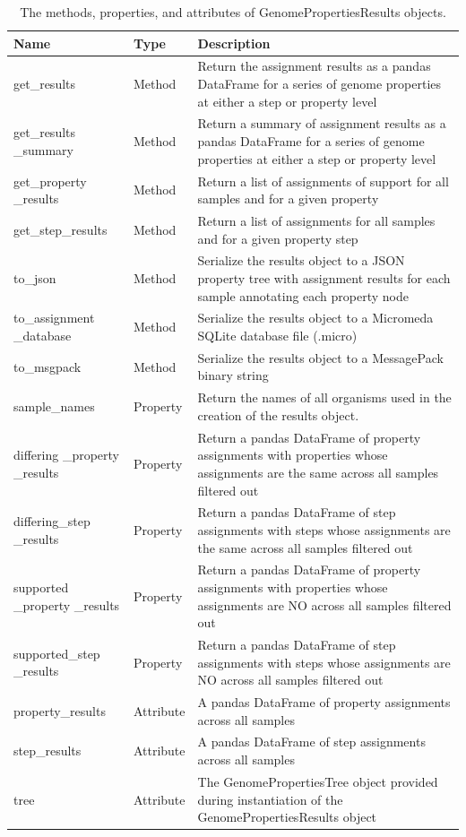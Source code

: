 \begin{longtable}{|p{2.7cm}|p{2cm}|p{10cm}|}
\caption{The methods, properties, and attributes of GenomePropertiesResults objects.}
\label{tab:results-object}\\
\hline
\textbf{Name} & \textbf{Type} & \textbf{Description} \\ \hline
\endfirsthead
%
\endhead
%
get\_results & Method & Return the assignment results as a pandas DataFrame for a series of genome properties at either a step or property level \\ \hline
get\_results \_summary & Method & Return a summary of assignment results as a pandas DataFrame for a series of genome properties at either a step or property level \\ \hline
get\_property \_results & Method & Return a list of assignments of support for all samples and for a given property \\ \hline
get\_step\_results & Method & Return a list of assignments for all samples and for a given property step \\ \hline
to\_json & Method & Serialize the results object to a JSON property tree with assignment results for each sample annotating each property node \\ \hline
to\_assignment \_database & Method & Serialize the results object to a Micromeda SQLite database file (.micro) \\ \hline
to\_msgpack & Method & Serialize the results object to a MessagePack binary string \\ \hline
sample\_names & Property & Return the names of all organisms used in the creation of the results object. \\ \hline
differing \_property \_results & Property & Return a pandas DataFrame of property assignments with properties whose assignments are the same across all samples filtered out \\ \hline
differing\_step \_results & Property & Return a pandas DataFrame of step assignments with steps whose assignments are the same across all samples filtered out \\ \hline
supported \_property \_results & Property & Return a pandas DataFrame of property assignments with properties whose assignments are NO across all samples filtered out \\ \hline
supported\_step \_results & Property & Return a pandas DataFrame of step assignments with steps whose assignments are NO across all samples filtered out \\ \hline
property\_results & Attribute & A pandas DataFrame of property assignments across all samples \\ \hline
step\_results & Attribute & A pandas DataFrame of step assignments across all samples \\ \hline
tree & Attribute & The GenomePropertiesTree object provided during instantiation of the GenomePropertiesResults object \\ \hline
\end{longtable}

